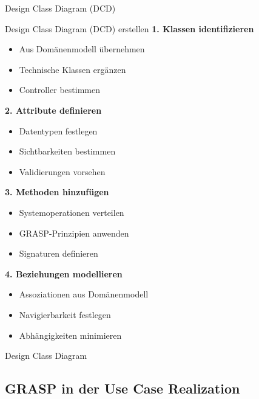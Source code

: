 \begin{concept}{Design Class Diagram (DCD)}
    
\end{concept}

\begin{KR}{Design Class Diagram (DCD) erstellen}
\textbf{1. Klassen identifizieren}
\begin{itemize}
    \item Aus Domänenmodell übernehmen
    \item Technische Klassen ergänzen
    \item Controller bestimmen
\end{itemize}

\textbf{2. Attribute definieren}
\begin{itemize}
    \item Datentypen festlegen
    \item Sichtbarkeiten bestimmen
    \item Validierungen vorsehen
\end{itemize}

\textbf{3. Methoden hinzufügen}
\begin{itemize}
    \item Systemoperationen verteilen
    \item GRASP-Prinzipien anwenden
    \item Signaturen definieren
\end{itemize}

\textbf{4. Beziehungen modellieren}
\begin{itemize}
    \item Assoziationen aus Domänenmodell
    \item Navigierbarkeit festlegen
    \item Abhängigkeiten minimieren
\end{itemize}
\end{KR}

\begin{example2}{Design Class Diagram}
\end{example2}

\columnbreak

\subsection{GRASP in der Use Case Realization}

